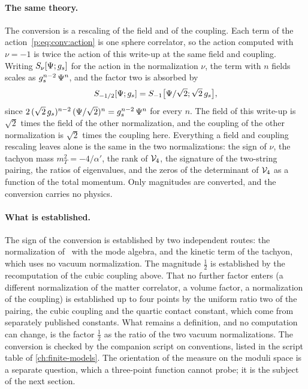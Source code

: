 \paragraph{The same theory.}
The conversion is a rescaling of the field and of the coupling.
Each term of the action~\eqref{p:eq:conv:action} is one sphere correlator, so the action computed with $\nu = -1$ is twice the action of this write-up at the same field and coupling.
Writing $S_{\nu}[\Psi; g_s]$ for the action in the normalization $\nu$, the term with $n$ fields scales as $g_s^{n-2} \, \Psi^n$, and the factor two is absorbed by
\begin{equation}
  \label{eq:conv:rescaling}
  S_{-1/2}[\Psi; g_s]
    = S_{-1} \big[ \Psi / \sqrt{2}; \sqrt{2} \, g_s \big],
\end{equation}
since $2 \, (\sqrt{2} \, g_s)^{n-2} \, (\Psi / \sqrt{2})^n = g_s^{n-2} \, \Psi^n$ for every $n$.
The field of this write-up is $\sqrt{2}$ times the field of the other normalization, and the coupling of the other normalization is $\sqrt{2}$ times the coupling here.
Everything a field and coupling rescaling leaves alone is the same in the two normalizations: the sign of $\nu$, the tachyon mass $m_T^2 = - 4 / \alpha'$, the rank of $\mathcal{V}_{4}$, the signature of the two-string pairing, the ratios of eigenvalues, and the zeros of the determinant of $\mathcal{V}_{4}$ as a function of the total momentum.
Only magnitudes are converted, and the conversion carries no physics.

\paragraph{What is established.}
The sign of the conversion is established by two independent routes: the normalization of~\cite{Erbin:2021:StringFieldTheory} with the mode algebra, and the kinetic term of the tachyon, which uses no vacuum normalization.
The magnitude $\tfrac{1}{2}$ is established by the recomputation of the cubic coupling above.
That no further factor enters (a different normalization of the matter correlator, a volume factor, a normalization of the coupling) is established up to four points by the uniform ratio two of the pairing, the cubic coupling and the quartic contact constant, which come from separately published constants.
What remains a definition, and no computation can change, is the factor $\tfrac{1}{2}$ as the ratio of the two vacuum normalizations.
The conversion is checked by the companion script on conventions, listed in the script table of \cref{ch:finite-models}.
The orientation of the measure on the moduli space is a separate question, which a three-point function cannot probe; it is the subject of the next section.


